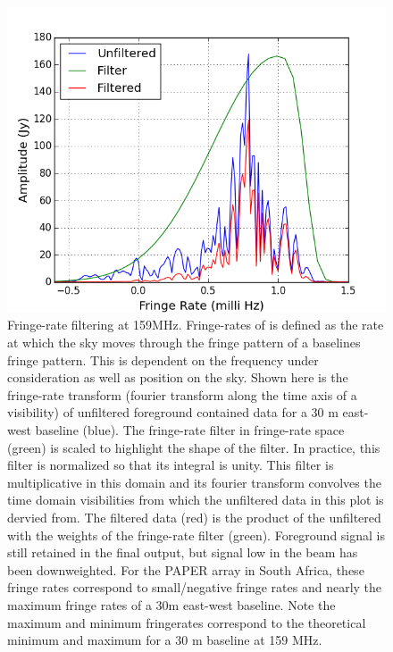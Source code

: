 \documentclass[twocolumn,numberedappendix]{emulateapj} \shorttitle{PSA64}
\begin{document}
\begin{figure}[t!]\centering
\includegraphics[width=\columnwidth]{plots/fr_preserved_signal.png}
\caption{
Fringe-rate filtering at 159MHz. Fringe-rates of is defined as the rate at which
the sky moves through the fringe pattern of a baselines fringe pattern. This is
dependent on the frequency under consideration as well as position on the sky.
Shown here is the fringe-rate transform (fourier transform along the time axis
of a visibility) of unfiltered foreground contained data for a 30 m east-west
baseline (blue). The fringe-rate filter in fringe-rate space (green) is scaled
to highlight the shape of the filter. In practice, this filter is normalized so
that its integral is unity.  This filter is multiplicative in this domain and
its fourier transform convolves the time domain visibilities from which the
unfiltered data in this plot is dervied from.  The filtered data (red) is the
product of the unfiltered with the weights of the fringe-rate filter (green).
Foreground signal is still retained in the final output, but signal low in the
beam has been downweighted. For the PAPER array in South Africa, these fringe
rates correspond to small/negative fringe rates and nearly the maximum fringe
rates of a 30m east-west baseline. Note the maximum and minimum fringerates
correspond to the theoretical minimum and maximum for a 30 m baseline at 159
MHz.
}
\label{fig:fr_preserved_signal}
\end{figure}
\end{document}
